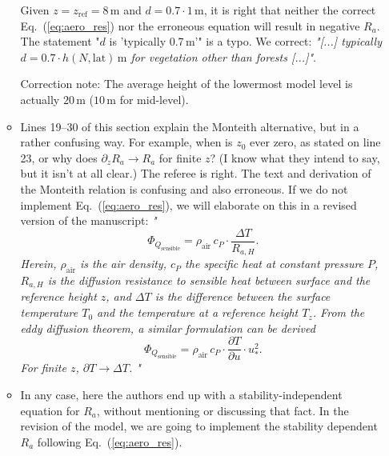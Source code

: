 \begin{itemize}
\begin{itemize}
  Given $z = z_\mathrm{ref} = 8\,\mathrm{m}$ and $d = 0.7\cdot 1\,\mathrm{m}$, it is right that neither the correct Eq.~(\ref{eq:aero_res}) nor the erroneous equation will result in negative $R_a$. The statement "$d$ is ’typically 0.7\,m’" is a typo. We correct: \emph{"[...] typically $d = 0.7\cdot h(N,\mathrm{lat})\,\mathrm{m}$ for vegetation other than forests [...]"}.

  Correction note: The average height of the lowermost model level is actually $20\,\mathrm{m}$ ($10\,\mathrm{m}$ for mid-level).
  
\item {\color{blue} Lines 19--30 of this section explain the Monteith alternative, but in a rather confusing
way. For example, when is $z_0$ ever zero, as stated on line 23, or why does $\partial_z R_a \rightarrow R_a $
for finite $z$? (I know what they intend to say, but it isn’t at all clear.)}
  The referee is right. The text and derivation of the Monteith relation is confusing and also erroneous. If we do not implement Eq.~(\ref{eq:aero_res}), we will elaborate on this in a revised version of the manuscript: \emph{"
\begin{equation}
  \Phi_{Q_\text{sensible}} = \rho_\text{air}\,c_P \cdot \frac{\Delta T}{R_{a, H}}.
  \label{eq:sens_heat}
\end{equation}
Herein, $\rho_\text{air}$ is the air density, $c_P$ the specific heat at constant pressure $P$, $R_{a, H}$ is the diffusion resistance to sensible heat between surface and the reference height $z$, and $\Delta T$ is the difference between the surface temperature $T_0$ and the temperature at a reference height $T_z$. From the eddy diffusion theorem, a similar formulation can be derived
\begin{equation}
  \Phi_{Q_\text{sensible}} = \rho_\text{air}\,c_P \cdot \frac{\partial T}{\partial u} \cdot u_*^2.
  \label{eq:eddy_theo}
\end{equation}
For finite $z$, $\partial T \rightarrow \Delta T$.
  "}

\item {\color{blue} In any case, here
the authors end up with a stability-independent equation for $R_a$, without mentioning or
discussing that fact.}
  In the revision of the model, we are going to implement the stability dependent $R_a$ following Eq.~(\ref{eq:aero_res}).
  

\end{itemize}
\end{itemize}
